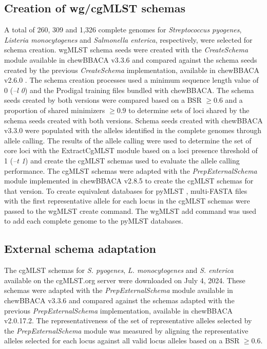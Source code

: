 \subsection{Creation of wg/cgMLST schemas} \label{ssec:methods_ssec3}

A total of 260, 309 and 1,326 complete genomes for \textit{Streptococcus pyogenes}, \textit{Listeria monocytogenes} and \textit{Salmonella enterica}, respectively, were selected for schema creation. wgMLST schema seeds were created with the \textit{CreateSchema} module available in chewBBACA v3.3.6 and compared against the schema seeds created by the previous \textit{CreateSchema} implementation, available in chewBBACA v2.6.0 \citep{silva_chewbbaca_2018}. The schema creation processes used a minimum sequence length value of 0 (\textit{--l 0}) and the Prodigal \citep{hyatt_prodigal_2010} training files bundled with chewBBACA. The schema seeds created by both versions were compared based on a BSR $\geq0.6$ and a proportion of shared minimizers $\geq0.9$ to determine sets of loci shared by the schema seeds created with both versions. Schema seeds created with chewBBACA v3.3.0 were populated with the alleles identified in the complete genomes through allele calling. The results of the allele calling were used to determine the set of core loci with the ExtractCgMLST module based on a loci presence threshold of 1 (\textit{--t 1}) and create the cgMLST schemas used to evaluate the allele calling performance. The cgMLST schemas were adapted with the \textit{PrepExternalSchema} module implemented in chewBBACA v2.8.5 to create the cgMLST schemas for that version. To create equivalent databases for pyMLST \citep{biguenet_introduction_2023}, multi-FASTA files with the first representative allele for each locus in the cgMLST schemas were passed to the wgMLST create command. The wgMLST add command was used to add each complete genome to the pyMLST databases.

\subsection{External schema adaptation} \label{ssec:methods_ssec4}

The cgMLST schemas for \textit{S. pyogenes}, \textit{L. monocytogenes} and \textit{S. enterica} available on the cgMLST.org server \citep{noauthor_cgmlstorg_nodate} were downloaded on July 4, 2024. These schemas were adapted with the \textit{PrepExternalSchema} module available in chewBBACA v3.3.6 and compared against the schemas adapted with the previous \textit{PrepExternalSchema} implementation, available in chewBBACA v2.0.17.2. The representativeness of the set of representative alleles selected by the \textit{PrepExternalSchema} module was measured by aligning the representative alleles selected for each locus against all valid locus alleles based on a BSR $\geq0.6$.

